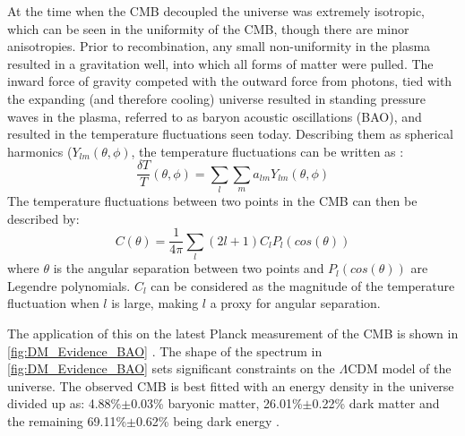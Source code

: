 \par
At the time when the CMB decoupled the universe was extremely isotropic, which can be seen in the uniformity of the CMB, though there are minor anisotropies.
Prior to recombination, any small non-uniformity in the plasma resulted in a gravitation well, into which all forms of matter were pulled.
The inward force of gravity competed with the outward force from photons, tied with the expanding (and therefore cooling) universe resulted in standing pressure waves in the plasma, referred to as baryon acoustic oscillations (BAO), and resulted in the temperature fluctuations seen today.
Describing them as spherical harmonics ($Y_{lm}(\theta,\phi)$, the temperature fluctuations can be written as \cite{History_Of_Dark_Matter_2018_ref}:
\begin{equation}
    \frac{\delta T}{T}(\theta, \phi) = \sum_{l} \sum_{m} a_{lm}Y_{lm}(\theta,\phi)
    \label{eq:bao_spherical_harmonics}
\end{equation}
The temperature fluctuations between two points in the CMB can then be described by:
\begin{equation}
    C(\theta) = \frac{1}{4\pi} \sum_{l} (2l + 1) C_l P_l (cos(\theta))
\end{equation}
where $\theta$ is the angular separation between two points and $P_l (cos(\theta))$ are Legendre polynomials.
$C_l$ can be considered as the magnitude of the temperature fluctuation when $l$ is large, making $l$ a proxy for angular separation.
\par
The application of this on the latest Planck measurement of the CMB is shown in \autoref{fig:DM_Evidence_BAO} \cite{plank_result_ref}.
The shape of the spectrum in \autoref{fig:DM_Evidence_BAO} sets significant constraints on the $\Lambda$CDM model of the universe.
The observed CMB is best fitted with an energy density in the universe divided up as: 4.88\%$\pm$0.03\% baryonic matter, 26.01\%$\pm$0.22\% dark matter and the remaining 69.11\%$\pm$0.62\% being dark energy \cite{plank_result_ref}.

